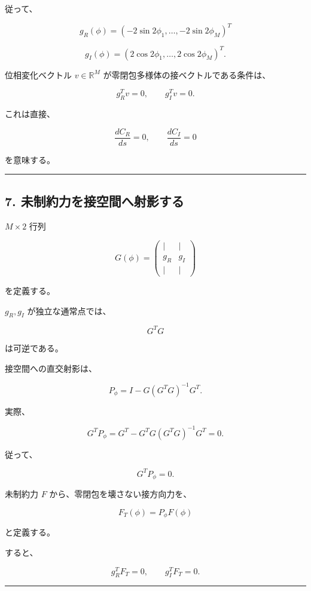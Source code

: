 \documentclass[
  a4paper,
]{ltjsarticle}
\begin{document}
従って、

\[
\boxed{
g_R(\phi)
=
(-2\sin2\phi_1,\ldots,-2\sin2\phi_M)^T
}
\tag{17}
\]

\[
\boxed{
g_I(\phi)
=
(2\cos2\phi_1,\ldots,2\cos2\phi_M)^T.
}
\tag{18}
\]

位相変化ベクトル \(v\in\mathbb R^M\)
が零閉包多様体の接ベクトルである条件は、

\[
g_R^Tv=0,
\qquad
g_I^Tv=0.
\tag{19}
\]

これは直接、

\[
\frac{dC_R}{ds}=0,
\qquad
\frac{dC_I}{ds}=0
\]

を意味する。

\begin{center}\rule{0.5\linewidth}{0.5pt}\end{center}

\subsection{7.
未制約力を接空間へ射影する}\label{ux672aux5236ux7d04ux529bux3092ux63a5ux7a7aux9593ux3078ux5c04ux5f71ux3059ux308b}

\(M\times2\) 行列

\[
\boxed{
G(\phi)
=
\begin{pmatrix}
|&|\\
g_R&g_I\\
|&|
\end{pmatrix}
}
\tag{20}
\]

を定義する。

\(g_R,g_I\) が独立な通常点では、

\[
G^TG
\]

は可逆である。

接空間への直交射影は、

\[
\boxed{
P_\phi
=
I
-
G(G^TG)^{-1}G^T.
}
\tag{21}
\]

実際、

\[
G^TP_\phi
=
G^T
-
G^TG(G^TG)^{-1}G^T
=
0.
\]

従って、

\[
\boxed{
G^TP_\phi=0.
}
\tag{22}
\]

未制約力 \(F\) から、零閉包を壊さない接方向力を、

\[
\boxed{
F_T(\phi)
=
P_\phi F(\phi)
}
\tag{23}
\]

と定義する。

すると、

\[
g_R^TF_T=0,
\qquad
g_I^TF_T=0.
\tag{24}
\]

\begin{center}\rule{0.5\linewidth}{0.5pt}\end{center}
\end{document}
